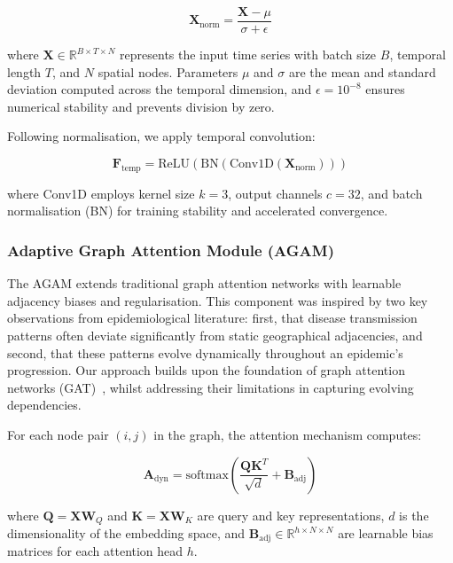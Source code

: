 \documentclass[lettersize, journal]{IEEEtran}
\begin{document}
\begin{equation}
\mathbf{X}_{\text{norm}} = \frac{\mathbf{X} - \mu}{\sigma + \epsilon}
\end{equation}

where $\mathbf{X} \in \mathbb{R}^{B \times T \times N}$ represents the input time series with batch size $B$, temporal length $T$, and $N$ spatial nodes. Parameters $\mu$ and $\sigma$ are the mean and standard deviation computed across the temporal dimension, and $\epsilon = 10^{-8}$ ensures numerical stability and prevents division by zero.

Following normalisation, we apply temporal convolution:

\begin{equation}
\mathbf{F}_{\text{temp}} = \text{ReLU}(\text{BN}(\text{Conv1D}(\mathbf{X}_{\text{norm}})))
\end{equation}

where Conv1D employs kernel size $k=3$, output channels $c=32$, and batch normalisation (BN) for training stability and accelerated convergence.

\subsubsection{Adaptive Graph Attention Module (AGAM)}
The AGAM extends traditional graph attention networks with learnable adjacency biases and regularisation. This component was inspired by two key observations from epidemiological literature: first, that disease transmission patterns often deviate significantly from static geographical adjacencies, and second, that these patterns evolve dynamically throughout an epidemic's progression. Our approach builds upon the foundation of graph attention networks (GAT)~\cite{gat}, whilst addressing their limitations in capturing evolving dependencies.

For each node pair $(i,j)$ in the graph, the attention mechanism computes:

\begin{equation}
\mathbf{A}_{\text{dyn}} = \text{softmax}\left(\frac{\mathbf{Q}\mathbf{K}^T}{\sqrt{d}} + \mathbf{B}_{\text{adj}}\right)
\end{equation}

where $\mathbf{Q} = \mathbf{X}\mathbf{W}_Q$ and $\mathbf{K} = \mathbf{X}\mathbf{W}_K$ are query and key representations, $d$ is the dimensionality of the embedding space, and $\mathbf{B}_{\text{adj}} \in \mathbb{R}^{h \times N \times N}$ are learnable bias matrices for each attention head $h$.
\end{document}
